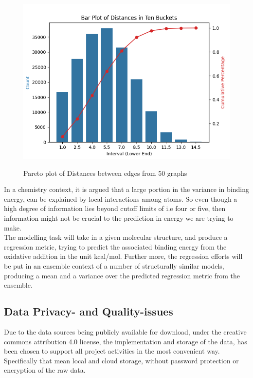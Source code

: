 \begin{figure}[H]
\caption{Pareto plot of Distances between edges from 50 graphs}
\centering\label{distances}
\includegraphics[width=\textwidth]{Images/Data/distances.png}
\end{figure}

In a chemistry context, it is argued that a large portion in the variance in binding energy, can be explained by local interactions 
among atoms\cite{PAINN}. So even though a high degree of information lies beyond cutoff limits of i.e four or five, then information 
might not be crucial to the prediction in energy we are trying to make. \\

The modelling task will take in a given molecular structure, and produce a regression metric, trying to predict the associated 
binding energy from the oxidative addition in the unit kcal/mol. Further more, the regression efforts will be put in an ensemble 
context of a number of structurally similar models, producing a mean and a variance over the predicted regression metric from the 
ensemble.\\

\subsection{Data Privacy- and Quality-issues}

Due to the data sources being publicly available for download, under the creative commons attribution 4.0 license,
 the implementation and storage of the data, has been chosen to support all project activities in the most convenient way. 
 Specifically that mean local and cloud storage, without password protection or encryption of the raw data. \\

